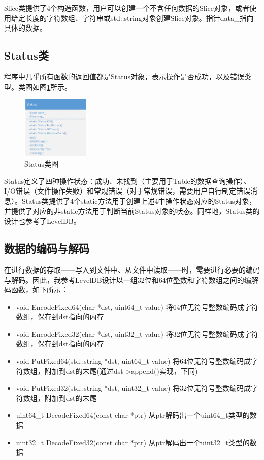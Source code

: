 \documentclass[bachelor]{thesis-uestc}
\begin{document}
Slice类提供了4个构造函数，用户可以创建一个不含任何数据的Slice对象，或者使用给定长度的字符数组、字符串或std::string对象创建Slice对象。指针data\_指向具体的数据。

\subsection{Status类}
程序中几乎所有函数的返回值都是Status对象，表示操作是否成功，以及错误类型。类图如图\ref{fig:status}所示。

\begin{figure}[htbp]
	\centering\includegraphics[height=3cm]{images/status.png}
	\caption{Status类图}
	\label{fig:status}
\end{figure}

Status定义了四种操作状态：成功、未找到（主要用于Table的数据查询操作）、I/O错误（文件操作失败）和常规错误（对于常规错误，需要用户自行制定错误消息）。Status类提供了4个static方法用于创建上述4中操作状态对应的Status对象，并提供了对应的非static方法用于判断当前Status对象的状态。同样地，Status类的设计也参考了LevelDB。

\subsection{数据的编码与解码}
在进行数据的存取——写入到文件中、从文件中读取——时，需要进行必要的编码与解码。因此，我参考LevelDB设计以一组32位和64位整数和字符数组之间的编解码函数，如下所示：

\begin{itemize}
	\item void EncodeFixed64(char *dst, uint64\_t value) 将64位无符号整数编码成字符数组，保存到dst指向的内存
	\item void EncodeFixed32(char *dst, uint32\_t value) 将32位无符号整数编码成字符数组，保存到dst指向的内存
	\item void PutFixed64(std::string *dst, uint64\_t value) 将64位无符号整数编码成字符数组，附加到dst的末尾(通过dst->append()实现，下同)
	\item void PutFixed32(std::string *dst, uint32\_t value) 将32位无符号整数编码成字符数组，附加到dst的末尾
	\item uint64\_t DecodeFixed64(const char *ptr) 从ptr解码出一个uint64\_t类型的数据
	\item uint32\_t DecodeFixed32(const char *ptr) 从ptr解码出一个uint32\_t类型的数据
\end{itemize}
\end{document}
